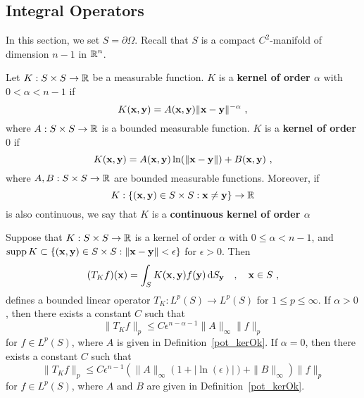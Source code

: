 \subsection{Integral Operators}

In this section, we set $S = \partial \Omega$.  Recall that $S$ is a compact
$\displaystyle C^2$-manifold of dimension $n-1$ in $\displaystyle \mathbb{R}^n$.

\begin{defn} \label{pot_kerOk}
Let $K:S \times S \rightarrow \mathbb{R}$ be a measurable function.  $K$ is a
{\bfseries kernel of order $\alpha$}
with $0< \alpha < n-1$ if
\[
K(\mathbf{x},\mathbf{y}) = A(\mathbf{x}, \mathbf{y}) \|\mathbf{x}-\mathbf{y}\|^{-\alpha} \ ,
\]
where $A:S\times S \rightarrow \mathbb{R}$ is a bounded measurable function.
$K$ is a
{\bfseries kernel of order $0$} if
\[
K(\mathbf{x},\mathbf{y}) = A(\mathbf{x}, \mathbf{y}) \ln(\|\mathbf{x}-\mathbf{y}\|)
+B(\mathbf{x},\mathbf{y}) \ ,
\]
where $A, B:S\times S \rightarrow \mathbb{R}$ are bounded measurable
functions.  Moreover, if
\[
K: \{ (\mathbf{x},\mathbf{y}) \in S \times S : \mathbf{x} \neq \mathbf{y} \}
\rightarrow \mathbb{R}
\]
is also continuous, we say that $K$ is a
{\bfseries continuous kernel of order $\alpha$}
\end{defn}

\begin{prop} \label{pot_lin_op_K}
Suppose that $K:S\times S \rightarrow \mathbb{R}$ is a kernel of order $\alpha$
with $0\leq \alpha < n-1$, and 
$\operatorname{supp} K \subset \{(\mathbf{x}, \mathbf{y}) \in S \times S :
\|\mathbf{x}-\mathbf{y}\| <\epsilon \}$ for $\epsilon > 0$.  Then
\[
(T_K f)(\mathbf{x}) = \int_S K(\mathbf{x},\mathbf{y}) f(\mathbf{y}) \,\mathrm{d}{S}_{\mathbf{y}}
\quad , \quad \mathbf{x} \in S \ ,
\]
defines a bounded linear operator
$\displaystyle T_K : L^p(S) \rightarrow L^p(S)$
for $1\leq p \leq \infty$.
If $\alpha>0$, then there exists a constant $C$ such that
\begin{equation} \label{pot_TK_Bound1}
\| T_K f \|_p \leq C \epsilon^{n-\alpha-1} \|A\|_{\infty} \|f\|_p
\end{equation}
for $\displaystyle f \in L^p(S)$,
where $A$ is given in Definition~\ref{pot_kerOk}.  If $\alpha = 0$,
then there exists a constant $C$ such that
\begin{equation} \label{pot_TK_Bound2}
\| T_K f \|_p \leq C \epsilon^{n-1} \left( \|A\|_{\infty}
(1 + |\ln(\epsilon)|) + \|B\|_\infty \right) \|f\|_p
\end{equation}
for $\displaystyle f \in L^p(S)$, where $A$ and $B$ are given in
Definition~\ref{pot_kerOk}.
\end{prop}

